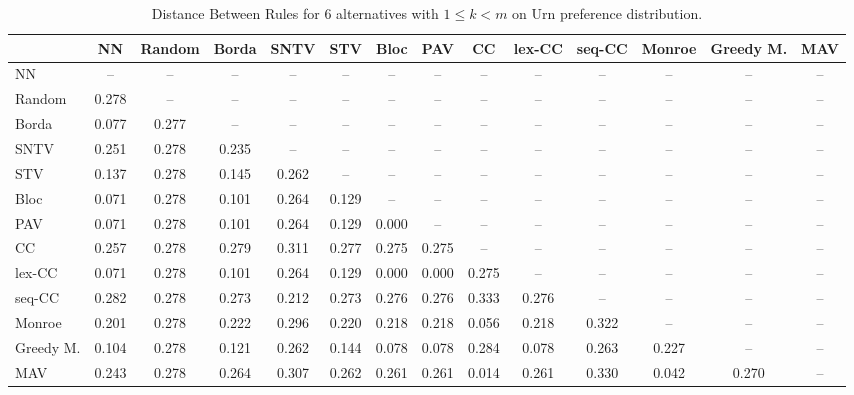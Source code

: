 
\begin{table*}
\centering
\begin{tabular}{lccccccccccccc}
\toprule
 & NN & Random & Borda & SNTV & STV & Bloc & PAV & CC & lex-CC & seq-CC & Monroe & Greedy M. & MAV \\
\midrule
NN & -- & -- & -- & -- & -- & -- & -- & -- & -- & -- & -- & -- & -- \\
Random & 0.278 & -- & -- & -- & -- & -- & -- & -- & -- & -- & -- & -- & -- \\
Borda & 0.077 & 0.277 & -- & -- & -- & -- & -- & -- & -- & -- & -- & -- & -- \\
SNTV & 0.251 & 0.278 & 0.235 & -- & -- & -- & -- & -- & -- & -- & -- & -- & -- \\
STV & 0.137 & 0.278 & 0.145 & 0.262 & -- & -- & -- & -- & -- & -- & -- & -- & -- \\
Bloc & 0.071 & 0.278 & 0.101 & 0.264 & 0.129 & -- & -- & -- & -- & -- & -- & -- & -- \\
PAV & 0.071 & 0.278 & 0.101 & 0.264 & 0.129 & 0.000 & -- & -- & -- & -- & -- & -- & -- \\
CC & 0.257 & 0.278 & 0.279 & 0.311 & 0.277 & 0.275 & 0.275 & -- & -- & -- & -- & -- & -- \\
lex-CC & 0.071 & 0.278 & 0.101 & 0.264 & 0.129 & 0.000 & 0.000 & 0.275 & -- & -- & -- & -- & -- \\
seq-CC & 0.282 & 0.278 & 0.273 & 0.212 & 0.273 & 0.276 & 0.276 & 0.333 & 0.276 & -- & -- & -- & -- \\
Monroe & 0.201 & 0.278 & 0.222 & 0.296 & 0.220 & 0.218 & 0.218 & 0.056 & 0.218 & 0.322 & -- & -- & -- \\
Greedy M. & 0.104 & 0.278 & 0.121 & 0.262 & 0.144 & 0.078 & 0.078 & 0.284 & 0.078 & 0.263 & 0.227 & -- & -- \\
MAV & 0.243 & 0.278 & 0.264 & 0.307 & 0.262 & 0.261 & 0.261 & 0.014 & 0.261 & 0.330 & 0.042 & 0.270 & -- \\
\bottomrule
\end{tabular}

\caption{Distance Between Rules for 6 alternatives with $1 \leq k < m$ on Urn preference distribution.}
\end{table*}
